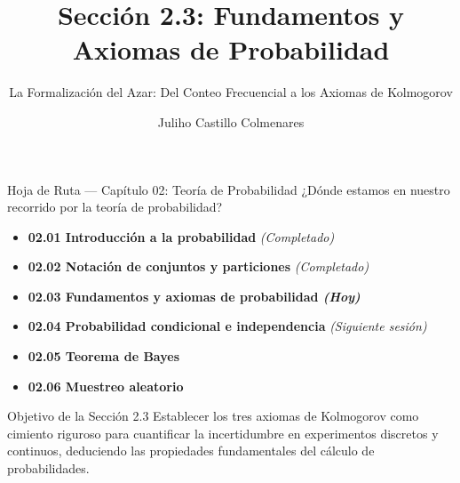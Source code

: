 


\title[Fundamentos y Axiomas]{Sección 2.3: Fundamentos y Axiomas de Probabilidad}
\subtitle{La Formalización del Azar: Del Conteo Frecuencial a los Axiomas de Kolmogorov}
\author[J. Castillo Colmenares]{Juliho Castillo Colmenares}
\date{}



\begin{frame}[plain]
  \titlepage
\end{frame}

\begin{frame}{Hoja de Ruta — Capítulo 02: Teoría de Probabilidad}
  ¿Dónde estamos en nuestro recorrido por la teoría de probabilidad? \pause
  \begin{itemize}
    \item \textbf{02.01 Introducción a la probabilidad} \emph{(Completado)} \pause
    \item \textbf{02.02 Notación de conjuntos y particiones} \emph{(Completado)} \pause
    \item \color{TecRojo}\textbf{02.03 Fundamentos y axiomas de probabilidad \emph{(Hoy)}}\color{black} \pause
    \item \textbf{02.04 Probabilidad condicional e independencia} \emph{(Siguiente sesión)} \pause
    \item \textbf{02.05 Teorema de Bayes} \pause
    \item \textbf{02.06 Muestreo aleatorio}
  \end{itemize}
  \vspace{0.6em}
  \begin{block}{Objetivo de la Sección 2.3}
    Establecer los tres axiomas de Kolmogorov como cimiento riguroso para cuantificar la incertidumbre en experimentos discretos y continuos, deduciendo las propiedades fundamentales del cálculo de probabilidades.
  \end{block}
\end{frame}

